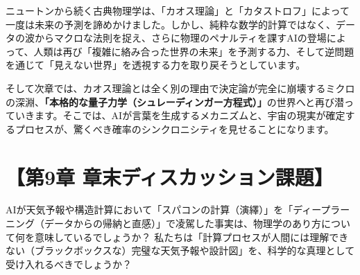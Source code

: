 ニュートンから続く古典物理学は、「カオス理論」と「カタストロフ」によって一度は未来の予測を諦めかけました。しかし、純粋な数学的計算ではなく、データの波からマクロな法則を捉え、さらに物理のペナルティを課すAIの登場によって、人類は再び「複雑に絡み合った世界の未来」を予測する力、そして逆問題を通じて「見えない世界」を透視する力を取り戻そうとしています。

そして次章では、カオス理論とは全く別の理由で決定論が完全に崩壊するミクロの深淵、\textbf{「本格的な量子力学（シュレーディンガー方程式）」}の世界へと再び潜っていきます。そこでは、AIが言葉を生成するメカニズムと、宇宙の現実が確定するプロセスが、驚くべき確率のシンクロニシティを見せることになります。

\section*{【第9章 章末ディスカッション課題】}

AIが天気予報や構造計算において「スパコンの計算（演繹）」を「ディープラーニング（データからの帰納と直感）」で凌駕した事実は、物理学のあり方について何を意味しているでしょうか？ 私たちは「計算プロセスが人間には理解できない（ブラックボックスな）完璧な天気予報や設計図」を、科学的な真理として受け入れるべきでしょうか？




